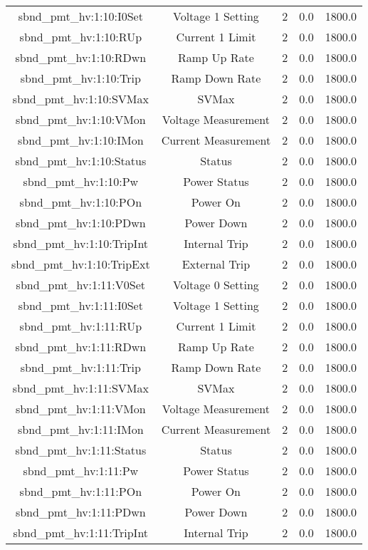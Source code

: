 \begin{center}
\begin{longtable}{c | c c c c }
sbnd\_pmt\_hv:1:10:I0Set & Voltage 1 Setting & 2 & 0.0 & 1800.0\\ 
sbnd\_pmt\_hv:1:10:RUp & Current 1 Limit & 2 & 0.0 & 1800.0\\ 
sbnd\_pmt\_hv:1:10:RDwn & Ramp Up Rate & 2 & 0.0 & 1800.0\\ 
sbnd\_pmt\_hv:1:10:Trip & Ramp Down Rate & 2 & 0.0 & 1800.0\\ 
sbnd\_pmt\_hv:1:10:SVMax & SVMax & 2 & 0.0 & 1800.0\\ 
sbnd\_pmt\_hv:1:10:VMon & Voltage Measurement & 2 & 0.0 & 1800.0\\ 
sbnd\_pmt\_hv:1:10:IMon & Current Measurement & 2 & 0.0 & 1800.0\\ 
sbnd\_pmt\_hv:1:10:Status & Status & 2 & 0.0 & 1800.0\\ 
sbnd\_pmt\_hv:1:10:Pw & Power Status & 2 & 0.0 & 1800.0\\ 
sbnd\_pmt\_hv:1:10:POn & Power On & 2 & 0.0 & 1800.0\\ 
sbnd\_pmt\_hv:1:10:PDwn & Power Down & 2 & 0.0 & 1800.0\\ 
sbnd\_pmt\_hv:1:10:TripInt & Internal Trip & 2 & 0.0 & 1800.0\\ 
sbnd\_pmt\_hv:1:10:TripExt & External Trip & 2 & 0.0 & 1800.0\\ 
sbnd\_pmt\_hv:1:11:V0Set & Voltage 0 Setting & 2 & 0.0 & 1800.0\\ 
sbnd\_pmt\_hv:1:11:I0Set & Voltage 1 Setting & 2 & 0.0 & 1800.0\\ 
sbnd\_pmt\_hv:1:11:RUp & Current 1 Limit & 2 & 0.0 & 1800.0\\ 
sbnd\_pmt\_hv:1:11:RDwn & Ramp Up Rate & 2 & 0.0 & 1800.0\\ 
sbnd\_pmt\_hv:1:11:Trip & Ramp Down Rate & 2 & 0.0 & 1800.0\\ 
sbnd\_pmt\_hv:1:11:SVMax & SVMax & 2 & 0.0 & 1800.0\\ 
sbnd\_pmt\_hv:1:11:VMon & Voltage Measurement & 2 & 0.0 & 1800.0\\ 
sbnd\_pmt\_hv:1:11:IMon & Current Measurement & 2 & 0.0 & 1800.0\\ 
sbnd\_pmt\_hv:1:11:Status & Status & 2 & 0.0 & 1800.0\\ 
sbnd\_pmt\_hv:1:11:Pw & Power Status & 2 & 0.0 & 1800.0\\ 
sbnd\_pmt\_hv:1:11:POn & Power On & 2 & 0.0 & 1800.0\\ 
sbnd\_pmt\_hv:1:11:PDwn & Power Down & 2 & 0.0 & 1800.0\\ 
sbnd\_pmt\_hv:1:11:TripInt & Internal Trip & 2 & 0.0 & 1800.0\\ 

\end{longtable}
\end{center}
